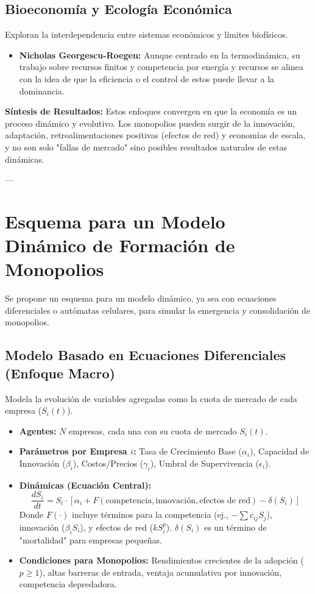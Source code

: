 \documentclass{article}
\begin{document}
\subsection{Bioeconomía y Ecología Económica}
Exploran la interdependencia entre sistemas económicos y límites biofísicos.
\begin{itemize}
    \item \textbf{Nicholas Georgescu-Roegen:} Aunque centrado en la termodinámica, su trabajo sobre recursos finitos y competencia por energía y recursos se alinea con la idea de que la eficiencia o el control de estos puede llevar a la dominancia.
\end{itemize}

\textbf{Síntesis de Resultados:}
Estos enfoques convergen en que la economía es un proceso dinámico y evolutivo. Los monopolios pueden surgir de la innovación, adaptación, retroalimentaciones positivas (efectos de red) y economías de escala, y no son solo "fallas de mercado" sino posibles resultados naturales de estas dinámicas.

---

\section{Esquema para un Modelo Dinámico de Formación de Monopolios}

Se propone un esquema para un modelo dinámico, ya sea con ecuaciones diferenciales o autómatas celulares, para simular la emergencia y consolidación de monopolios.

\subsection{Modelo Basado en Ecuaciones Diferenciales (Enfoque Macro)}
Modela la evolución de variables agregadas como la cuota de mercado de cada empresa ($S_i(t)$).
\begin{itemize}
    \item \textbf{Agentes:} $N$ empresas, cada una con su cuota de mercado $S_i(t)$.
    \item \textbf{Parámetros por Empresa $i$:} Tasa de Crecimiento Base ($\alpha_i$), Capacidad de Innovación ($\beta_i$), Costos/Precios ($\gamma_i$), Umbral de Supervivencia ($\epsilon_i$).
    \item \textbf{Dinámicas (Ecuación Central):}
        $$\frac{dS_i}{dt} = S_i \cdot [ \alpha_i + F(\text{competencia}, \text{innovación}, \text{efectos de red}) - \delta(S_i) ]$$
        Donde $F(\cdot)$ incluye términos para la competencia (ej., $-\sum c_{ij}S_j$), innovación ($\beta_i S_i$), y efectos de red ($k S_i^p$). $\delta(S_i)$ es un término de "mortalidad" para empresas pequeñas.
    \item \textbf{Condiciones para Monopolios:} Rendimientos crecientes de la adopción ($p \geq 1$), altas barreras de entrada, ventaja acumulativa por innovación, competencia depredadora.
\end{itemize}
\end{document}
